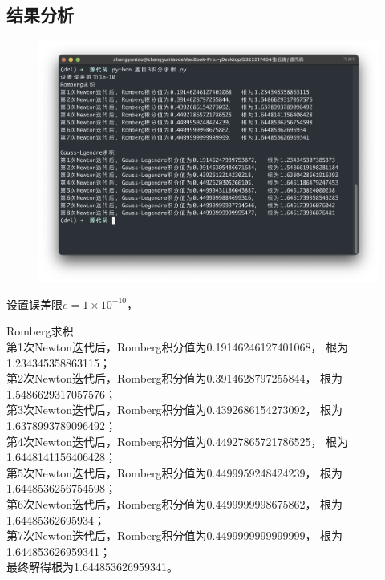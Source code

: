 \documentclass{article}
\begin{document}
\subsection{结果分析}
\begin{figure}[H]
    \centering
    \includegraphics[width=\textwidth]{相关资源/图片/题目3运行结果.png} 
\end{figure}

设置误差限$e=1\times10^{-10}$，

Romberg求积 \\
第1次Newton迭代后，Romberg积分值为0.19146246127401068，	根为1.234345358863115； \\
第2次Newton迭代后，Romberg积分值为0.3914628797255844，	根为1.5486629317057576；\\
第3次Newton迭代后，Romberg积分值为0.4392686154273092，	根为1.6378993789096492；\\
第4次Newton迭代后，Romberg积分值为0.44927865721786525，	根为1.6448141156406428；\\
第5次Newton迭代后，Romberg积分值为0.4499959248424239，	根为1.6448536256754598；\\
第6次Newton迭代后，Romberg积分值为0.4499999998675862，	根为1.64485362695934；\\
第7次Newton迭代后，Romberg积分值为0.4499999999999999，	根为1.644853626959341；\\
最终解得根为1.644853626959341。\\
\end{document}
